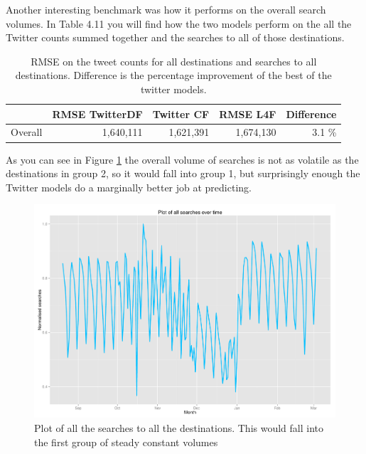 \documentclass[minf,frontabs,twoside,singlespacing,parskip]{infthesis}
\begin{document}
Another interesting benchmark was how it performs on the overall search volumes. In Table 4.11 you will find how the two models perform on the all the Twitter counts summed together and the searches to all of those destinations.

\begin{table}[h!]
\begin{center}
\begin{tabular}{ l | r | r | r | r}
 & RMSE TwitterDF & Twitter CF & RMSE L4F & Difference \\
\hline
Overall & 1,640,111 & 1,621,391  & 1,674,130 & 3.1 \% \\
\end{tabular}
\end{center}
\caption{RMSE on the tweet counts for all destinations and searches to all destinations. Difference is the percentage improvement of the best of the twitter models.}
\end{table}

As you can see in Figure \ref{overall-searches} the overall volume of searches is not as volatile as the destinations in group 2, so it would fall into group 1, but surprisingly enough the Twitter models do a marginally better job at predicting.

\begin{figure}[h]
\begin{center}
\includegraphics[scale=0.5]{overall}
\end{center}
\caption{Plot of all the searches to all the destinations. This would fall into the first group of steady constant volumes}
\label{overall-searches}
\end{figure}
\end{document}
